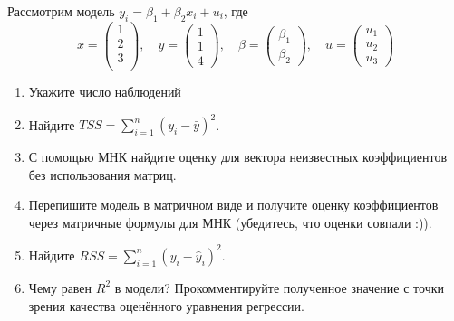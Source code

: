 \documentclass[12pt]{article}
\newcommand{\hy}{\hat{y}}
\newcommand{\RSS}{RSS}
\newcommand{\TSS}{TSS}
\begin{document}
\begin{problem}
    Рассмотрим модель $y_i = \beta_1 + \beta_2 x_{i} + u_i$, 
    где
    \[
    x = \begin{pmatrix} 
      1 \\ 
      2 \\ 
      3 \\ 
    \end{pmatrix}, \quad
    y = \begin{pmatrix} 1 \\ 1 \\ 4 \end{pmatrix}, \quad
    \beta = \begin{pmatrix} \beta_1 \\ \beta_2 \end{pmatrix}, \quad
    u = \begin{pmatrix} u_1 \\ u_2 \\ u_3 \end{pmatrix}
    \]   
    
    \begin{enumerate}
    \item Укажите число наблюдений
    \item Найдите $\TSS = \sum_{i=1}^n (y_i - \bar y)^2$.
    \item С помощью МНК найдите оценку для вектора неизвестных коэффициентов без использования матриц.
    \item Перепишите модель в матричном виде и получите оценку коэффициентов через матричные формулы для МНК (убедитесь, что оценки совпали :)).
    \item Найдите $\RSS = \sum_{i=1}^n (y_i - \hy_i)^2$.
    \item Чему равен $R^2$ в модели? Прокомментируйте полученное значение с точки зрения качества оценённого уравнения регрессии.
    \end{enumerate}
\end{problem}
\end{document}
